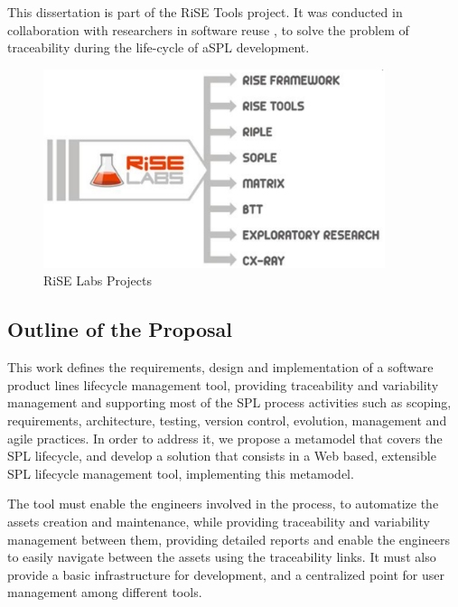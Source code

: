 This dissertation is part of the \ac{RiSE} Tools project. It was conducted in collaboration with researchers in software reuse , to solve the problem of traceability during the life-cycle of a\acf{SPL} development.


\begin{figure}[htp]
\begin{center}
  \includegraphics[width=10cm]{chapters/introduction/rise-projects.png}
  \caption[RiSE Labs Projects]{RiSE Labs Projects}
  \label{fg:rise-projects}
\end{center}
\end{figure}

\subsection{Outline of the Proposal}
This work defines the requirements, design and implementation of a software product lines lifecycle management tool, providing traceability and variability management and supporting most of the SPL process activities such as scoping, requirements, architecture, testing, version control, evolution, management and agile practices. In order to address it, we propose a metamodel that covers the SPL lifecycle, and develop a solution that consists in a Web based, extensible SPL lifecycle management tool, implementing this metamodel.  

The tool must enable the engineers involved in the process, to automatize the assets creation and maintenance, while providing traceability and variability management between them, providing detailed reports and enable the engineers to easily navigate between the assets using the traceability links. It must also provide a basic infrastructure for development, and a centralized point for user management among different tools.



